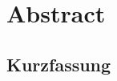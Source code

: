 \chapter*{Abstract}



\begin{otherlanguage}{ngerman}
\begingroup
\let\clearpage\relax
\vspace{2cm}
\chapter*{Kurzfassung}
\endgroup


\end{otherlanguage}
